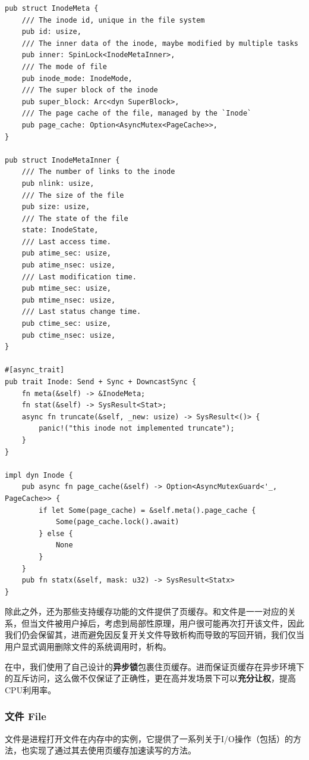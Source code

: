 \documentclass{article}
\begin{document}
\begin{lstlisting}
pub struct InodeMeta {
    /// The inode id, unique in the file system
    pub id: usize,
    /// The inner data of the inode, maybe modified by multiple tasks
    pub inner: SpinLock<InodeMetaInner>,
    /// The mode of file
    pub inode_mode: InodeMode,
    /// The super block of the inode
    pub super_block: Arc<dyn SuperBlock>,
    /// The page cache of the file, managed by the `Inode`
    pub page_cache: Option<AsyncMutex<PageCache>>,
}

pub struct InodeMetaInner {
    /// The number of links to the inode
    pub nlink: usize,
    /// The size of the file
    pub size: usize,
    /// The state of the file
    state: InodeState,
    /// Last access time.
    pub atime_sec: usize,
    pub atime_nsec: usize,
    /// Last modification time.
    pub mtime_sec: usize,
    pub mtime_nsec: usize,
    /// Last status change time.
    pub ctime_sec: usize,
    pub ctime_nsec: usize,
}

#[async_trait]
pub trait Inode: Send + Sync + DowncastSync {
    fn meta(&self) -> &InodeMeta;
    fn stat(&self) -> SysResult<Stat>;
    async fn truncate(&self, _new: usize) -> SysResult<()> {
        panic!("this inode not implemented truncate");
    }
}

impl dyn Inode {
    pub async fn page_cache(&self) -> Option<AsyncMutexGuard<'_, PageCache>> {
        if let Some(page_cache) = &self.meta().page_cache {
            Some(page_cache.lock().await)
        } else {
            None
        }
    }
    pub fn statx(&self, mask: u32) -> SysResult<Statx> 
}
\end{lstlisting}

除此之外，还为那些支持缓存功能的文件提供了页缓存。和文件是一一对应的关系，但当文件被用户掉后，考虑到局部性原理，用户很可能再次打开该文件，因此我们仍会保留其，进而避免因反复开关文件导致析构而导致的写回开销，我们仅当用户显式调用删除文件的系统调用时，析构。

在中，我们使用了自己设计的\textbf{异步锁}包裹住页缓存。进而保证页缓存在异步环境下的互斥访问，这么做不仅保证了正确性，更在高并发场景下可以\textbf{充分让权}，提高CPU利用率。

\subsubsection{文件 File}
文件是进程打开文件在内存中的实例，它提供了一系列关于I/O操作（包括）的方法，也实现了通过其去使用页缓存加速读写的方法。
\end{document}
